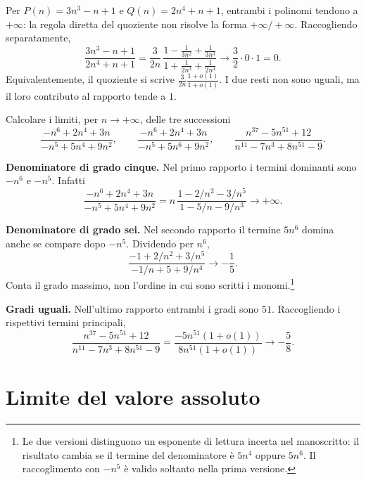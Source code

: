 \begin{esempio}
Per $P(n)=3n^3-n+1$ e $Q(n)=2n^4+n+1$, entrambi i polinomi tendono a $+\infty$: la regola diretta del quoziente non risolve la forma $+\infty/+\infty$. Raccogliendo separatamente,
\[
\frac{3n^3-n+1}{2n^4+n+1}
=\frac3{2n}\,
\frac{1-\frac1{3n^2}+\frac1{3n^3}}
{1+\frac1{2n^3}+\frac1{2n^4}}
\longrightarrow\frac32\cdot0\cdot1=0.
\]
Equivalentemente, il quoziente si scrive $\frac3{2n}\frac{1+o(1)}{1+o(1)}$. I due resti non sono uguali, ma il loro contributo al rapporto tende a $1$.
\end{esempio}

\begin{esercizio}
Calcolare i limiti, per $n\to+\infty$, delle tre successioni
\[
\frac{-n^6+2n^4+3n}{-n^5+5n^4+9n^2},\qquad
\frac{-n^6+2n^4+3n}{-n^5+5n^6+9n^2},\qquad
\frac{n^{37}-5n^{51}+12}{n^{11}-7n^3+8n^{51}-9}.
\]
\end{esercizio}
\begin{svolgimento}
\textbf{Denominatore di grado cinque.} Nel primo rapporto i termini dominanti sono $-n^6$ e $-n^5$. Infatti
\[
\frac{-n^6+2n^4+3n}{-n^5+5n^4+9n^2}
=n\,\frac{1-2/n^2-3/n^5}{1-5/n-9/n^3}
\longrightarrow+\infty.
\]

\textbf{Denominatore di grado sei.} Nel secondo rapporto il termine $5n^6$ domina anche se compare dopo $-n^5$. Dividendo per $n^6$,
\[
\frac{-1+2/n^2+3/n^5}{-1/n+5+9/n^4}
\longrightarrow-\frac15.
\]
Conta il grado massimo, non l'ordine in cui sono scritti i monomi.\footnote{Le due versioni distinguono un esponente di lettura incerta nel manoscritto: il risultato cambia se il termine del denominatore è $5n^4$ oppure $5n^6$. Il raccoglimento con $-n^5$ è valido soltanto nella prima versione.}

\textbf{Gradi uguali.} Nell'ultimo rapporto entrambi i gradi sono $51$. Raccogliendo i rispettivi termini principali,
\[
\frac{n^{37}-5n^{51}+12}{n^{11}-7n^3+8n^{51}-9}
=\frac{-5n^{51}(1+o(1))}{8n^{51}(1+o(1))}
\longrightarrow-\frac58.
\]
\end{svolgimento}

\section{Limite del valore assoluto}
\label{sec:limite-modulo}

